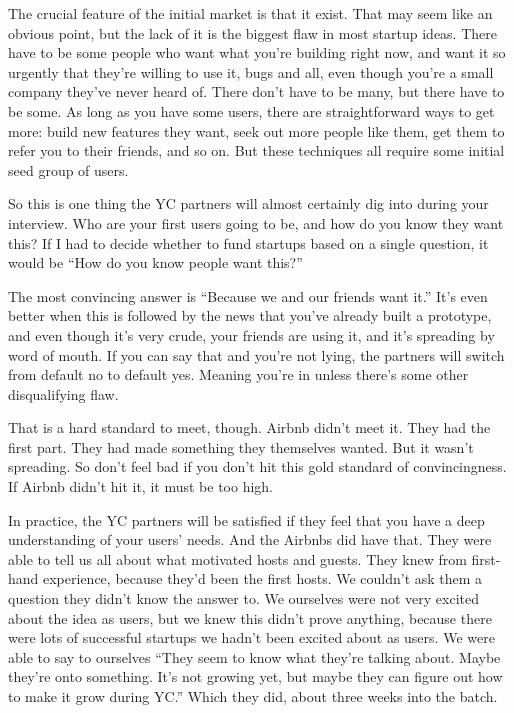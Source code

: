 The crucial feature of the initial market is that it exist. That may
seem like an obvious point, but the lack of it is the biggest flaw in
most startup ideas. There have to be some people who want what you're
building right now, and want it so urgently that they're willing to use
it, bugs and all, even though you're a small company they've never heard
of. There don't have to be many, but there have to be some. As long as
you have some users, there are straightforward ways to get more: build
new features they want, seek out more people like them, get them to
refer you to their friends, and so on. But these techniques all require
some initial seed group of users.

So this is one thing the YC partners will almost certainly dig into
during your interview. Who are your first users going to be, and how do
you know they want this? If I had to decide whether to fund startups
based on a single question, it would be ``How do you know people want
this?''

The most convincing answer is ``Because we and our friends want it.''
It's even better when this is followed by the news that you've already
built a prototype, and even though it's very crude, your friends are
using it, and it's spreading by word of mouth. If you can say that and
you're not lying, the partners will switch from default no to default
yes. Meaning you're in unless there's some other disqualifying flaw.

That is a hard standard to meet, though. Airbnb didn't meet it. They had
the first part. They had made something they themselves wanted. But it
wasn't spreading. So don't feel bad if you don't hit this gold standard
of convincingness. If Airbnb didn't hit it, it must be too high.

In practice, the YC partners will be satisfied if they feel that you
have a deep understanding of your users' needs. And the Airbnbs did have
that. They were able to tell us all about what motivated hosts and
guests. They knew from first-hand experience, because they'd been the
first hosts. We couldn't ask them a question they didn't know the answer
to. We ourselves were not very excited about the idea as users, but we
knew this didn't prove anything, because there were lots of successful
startups we hadn't been excited about as users. We were able to say to
ourselves ``They seem to know what they're talking about. Maybe they're
onto something. It's not growing yet, but maybe they can figure out how
to make it grow during YC.'' Which they did, about three weeks into the
batch.

